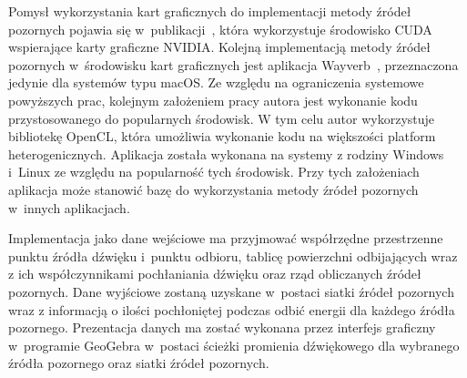 Pomysł  wykorzystania kart graficznych do implementacji metody źródeł pozornych pojawia się w~publikacji~\cite{b9}, która wykorzystuje środowisko CUDA wspierające karty graficzne NVIDIA. Kolejną implementacją metody źródeł pozornych w~środowisku kart graficznych jest aplikacja Wayverb~\cite{b10}, przeznaczona jedynie dla systemów typu macOS. Ze względu na ograniczenia systemowe powyższych prac, kolejnym założeniem pracy autora jest wykonanie kodu przystosowanego do popularnych środowisk. W tym celu autor wykorzystuje bibliotekę OpenCL, która umożliwia wykonanie kodu na większości platform heterogenicznych. Aplikacja została wykonana na systemy z rodziny Windows i~Linux ze względu na popularność tych środowisk. Przy tych założeniach aplikacja może stanowić bazę do wykorzystania metody źródeł pozornych w~innych aplikacjach.

Implementacja jako dane wejściowe ma przyjmować współrzędne przestrzenne punktu źródła dźwięku i~punktu odbioru, tablicę powierzchni odbijających wraz z ich współczynnikami pochłaniania dźwięku oraz rząd obliczanych źródeł pozornych. Dane wyjściowe zostaną uzyskane w~postaci siatki źródeł pozornych wraz z informacją o ilości pochłoniętej podczas odbić energii dla każdego źródła pozornego. Prezentacja danych ma zostać wykonana przez interfejs graficzny w~programie GeoGebra w~postaci ścieżki promienia dźwiękowego dla wybranego źródła pozornego oraz siatki źródeł pozornych.
















